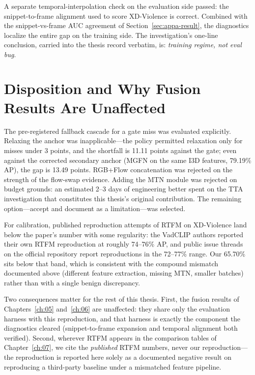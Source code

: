 A separate temporal-interpolation check on the evaluation side passed: the
snippet-to-frame alignment used to score XD-Violence is correct. Combined
with the snippet-vs-frame AUC agreement of Section~\ref{sec:appa-result},
the diagnostics localize the entire gap on the training side. The
investigation's one-line conclusion, carried into the thesis record
verbatim, is: \emph{training regime, not eval bug}.

\section{Disposition and Why Fusion Results Are Unaffected}
\label{sec:appa-disposition}

The pre-registered fallback cascade for a gate miss was evaluated
explicitly. Relaxing the anchor was inapplicable---the policy permitted
relaxation only for misses under 3 points, and the shortfall is 11.11 points
against the gate; even against the corrected secondary anchor (MGFN on the
same I3D features, 79.19\% AP), the gap is 13.49 points. RGB+Flow
concatenation was rejected on the strength of the flow-swap evidence.
Adding the MTN module was rejected on budget grounds: an estimated 2--3 days
of engineering better spent on the TTA investigation that constitutes this
thesis's original contribution. The remaining option---accept and document
as a limitation---was selected.

For calibration, published reproduction attempts of RTFM on XD-Violence
land below the paper's number with some regularity: the VadCLIP authors
reported their own RTFM reproduction at roughly 74--76\% AP, and public
issue threads on the official repository report reproductions in the
72--77\% range. Our 65.70\% sits below that band, which is consistent with
the compound mismatch documented above (different feature extraction,
missing MTN, smaller batches) rather than with a single benign discrepancy.

Two consequences matter for the rest of this thesis. First, the fusion
results of Chapters~\ref{ch:05} and~\ref{ch:06} are unaffected: they share
only the evaluation harness with this reproduction, and that harness is
exactly the component the diagnostics cleared (snippet-to-frame expansion
and temporal alignment both verified). Second, wherever RTFM appears in the
comparison tables of Chapter~\ref{ch:07}, we cite the \emph{published}
RTFM numbers, never our reproduction---the reproduction is reported here
solely as a documented negative result on reproducing a third-party
baseline under a mismatched feature pipeline.
